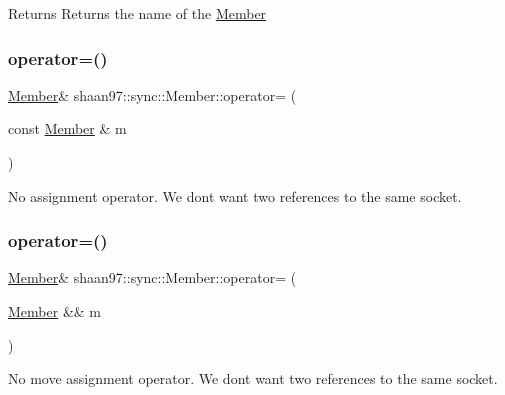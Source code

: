 \begin{DoxyReturn}{Returns}
Returns the name of the {\ttfamily \hyperlink{classshaan97_1_1sync_1_1_member}{Member}} 
\end{DoxyReturn}
\mbox{\label{classshaan97_1_1sync_1_1_member_aac54a26114acb5d975f162ab69bce538}} 
\subsubsection{\texorpdfstring{operator=()}{operator=()}\hspace{0.1cm}{\footnotesize\ttfamily [1/2]}}
{\footnotesize\ttfamily \hyperlink{classshaan97_1_1sync_1_1_member}{Member}\& shaan97\+::sync\+::\+Member\+::operator= (\begin{DoxyParamCaption}\item[{const \hyperlink{classshaan97_1_1sync_1_1_member}{Member} \&}]{m }\end{DoxyParamCaption})\hspace{0.3cm}{\ttfamily [delete]}}



No assignment operator. We don\textquotesingle{}t want two references to the same socket. 

\mbox{\label{classshaan97_1_1sync_1_1_member_a50f34f14f5325ec2dc9d05ddfca3ee3f}} 
\subsubsection{\texorpdfstring{operator=()}{operator=()}\hspace{0.1cm}{\footnotesize\ttfamily [2/2]}}
{\footnotesize\ttfamily \hyperlink{classshaan97_1_1sync_1_1_member}{Member}\& shaan97\+::sync\+::\+Member\+::operator= (\begin{DoxyParamCaption}\item[{\hyperlink{classshaan97_1_1sync_1_1_member}{Member} \&\&}]{m }\end{DoxyParamCaption})}



No move assignment operator. We don\textquotesingle{}t want two references to the same socket. 


